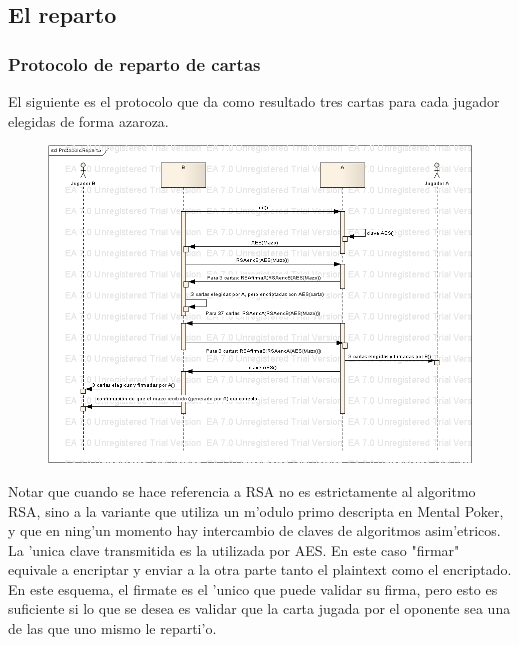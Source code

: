 \subsection{El reparto}
\subsubsection{Protocolo de reparto de cartas}
El siguiente es el protocolo que da como resultado tres cartas para cada jugador elegidas de forma azaroza.

\begin{figure}
\includegraphics{ProtocoloReparto.png}
\end{figure}

Notar que cuando se hace referencia a RSA no es estrictamente al algoritmo RSA, sino a la variante que utiliza un m'odulo primo descripta en Mental Poker, y que en ning'un momento hay intercambio de claves de algoritmos asim'etricos. La 'unica clave transmitida es la utilizada por AES.
En este caso "firmar" equivale a encriptar y enviar a la otra parte tanto el plaintext como el encriptado. En este esquema, el firmate es el 'unico que puede validar su firma, pero esto es suficiente si lo que se desea es validar que la carta jugada por el oponente sea una de las que uno mismo le reparti'o.

